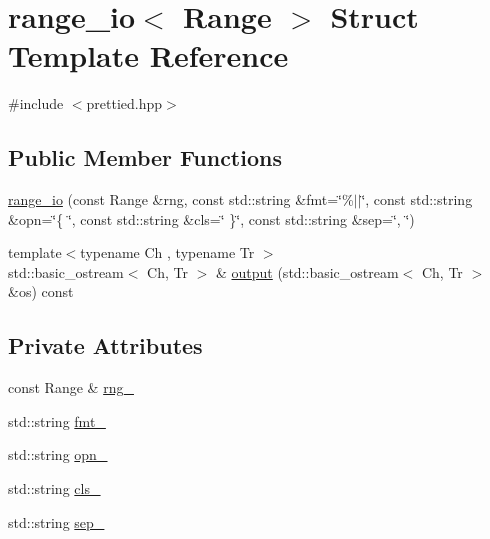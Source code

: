 \hypertarget{structyuh_1_1range__detail_1_1range__io}{\section{range\-\_\-io$<$ \-Range $>$ \-Struct \-Template \-Reference}
\label{da/d75/structyuh_1_1range__detail_1_1range__io}
}


{\ttfamily \#include $<$prettied.\-hpp$>$}

\subsection*{\-Public \-Member \-Functions}
\begin{DoxyCompactItemize}
\item 
\hyperlink{structyuh_1_1range__detail_1_1range__io_a565467d40387e95eda349445c59fe9af}{range\-\_\-io} (const \-Range \&rng, const std\-::string \&fmt=\char`\"{}\%$|$$|$\char`\"{}, const std\-::string \&opn=\char`\"{}\{ \char`\"{}, const std\-::string \&cls=\char`\"{} \}\char`\"{}, const std\-::string \&sep=\char`\"{}, \char`\"{})
\item 
{\footnotesize template$<$typename Ch , typename Tr $>$ }\\std\-::basic\-\_\-ostream$<$ \-Ch, \-Tr $>$ \& \hyperlink{structyuh_1_1range__detail_1_1range__io_a052a6e871c2df8d90729645678be1d4d}{output} (std\-::basic\-\_\-ostream$<$ \-Ch, \-Tr $>$ \&os) const 
\end{DoxyCompactItemize}
\subsection*{\-Private \-Attributes}
\begin{DoxyCompactItemize}
\item 
const \-Range \& \hyperlink{structyuh_1_1range__detail_1_1range__io_a1dc23cf32ae84636d442489c9629b987}{rng\-\_\-}
\item 
std\-::string \hyperlink{structyuh_1_1range__detail_1_1range__io_a5c63eb77f1b985d706bcb6dd96d0b0c4}{fmt\-\_\-}
\item 
std\-::string \hyperlink{structyuh_1_1range__detail_1_1range__io_a551279ac03e367c8394c7e2b2c78aa3e}{opn\-\_\-}
\item 
std\-::string \hyperlink{structyuh_1_1range__detail_1_1range__io_ac1750e01b56a52147effe52c4e83e247}{cls\-\_\-}
\item 
std\-::string \hyperlink{structyuh_1_1range__detail_1_1range__io_ae5b41e2a505b540f0b9a6e995030bcba}{sep\-\_\-}
\end{DoxyCompactItemize}


